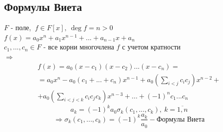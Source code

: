 \documentclass[a4paper, 12pt]{article}
\theoremstyle{definition}
\begin{document}
   \subsection{Формулы Виета}
   $F$ - поле, $\ f \in F[x], \ \deg f = n >0$\\
   $f(x) = a_0x^n+a_1x^{n-1}+...+a_{n-1}x+a_n$\\
   $c_1,...,c_n \in F$ - все корни многочлена $f$ с учетом кратности\\
   $\Longrightarrow$
   \begin{multline*}
    f(x) = a_0(x-c_1)(x-c_2)...(x-c_n) = \\
    = a_0x^n - a_0(c_1+...+c_n)x^{n-1}+a_0(\sum \limits_{i<j}c_ic_j)x^{n-2} +\\
    + a_0(\sum \limits_{i<j<k}c_ic_jc_k)x^{n-3} + ... + (-1)^nc_1...c_n
   \end{multline*}
    $$a_k = (-1)^ka_0\sigma_k(c_1,...,c_k), \ k = \overline{1,n}$$
    \[\Longrightarrow \sigma_k(c_1,...,c_k) = (-1)^k\frac{a_k}{a_0} - \text{Формулы Виета}\]
\end{document}
